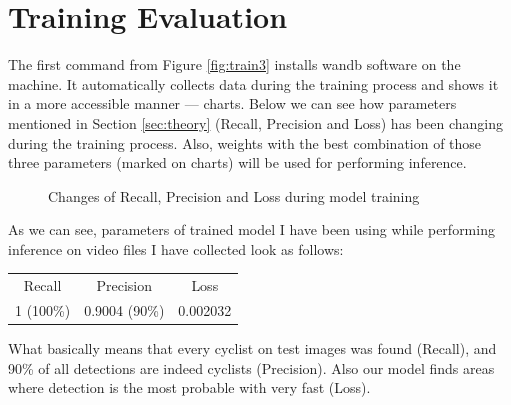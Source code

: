 \section{Training Evaluation}
\label{sec:eval}
The first command from Figure \ref{fig:train3} installs wandb software on the machine. It automatically collects data during the training process and shows it in a more accessible manner --- charts. Below we can see how parameters mentioned in Section \ref{sec:theory} (Recall, Precision and Loss) has been changing during the training process. Also, weights with the best combination of those three parameters (marked on charts) will be used for performing inference.
\begin{figure} [h]
    \centering
    \caption{Changes of Recall, Precision and Loss during model training}
    \label{fig:eval1}
\end{figure}
\newline As we can see, parameters of trained model I have been using while performing inference on video files I have collected look as follows:
\begin{center}
    \begin{tabular}{ccc}
    Recall    & Precision     & Loss     \\
    1 (100\%) & 0.9004 (90\%) & 0.002032
    \end{tabular}
\end{center}
What basically means that every cyclist on test images was found (Recall), and 90\% of all detections are indeed cyclists (Precision). Also our model finds areas where detection is the most probable with very fast (Loss).


